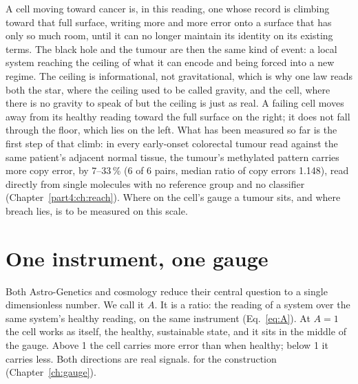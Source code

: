 A cell moving toward cancer is, in this reading, one whose record is climbing toward that full surface, writing more and more error onto
a surface that has only so much room, until it can no longer maintain its identity on its existing terms. The black hole and the tumour
are then the same kind of event: a local system reaching the ceiling of what it can encode and being forced into a new regime. \conjecture{}
The ceiling is informational, not gravitational, which is why one law reads both the star, where the ceiling used to be called gravity,
and the cell, where there is no gravity to speak of but the ceiling is just as real. A failing cell moves away from its healthy reading
toward the full surface on the right; it does not fall through the floor, which lies on the left. What has been measured so far is the
first step of that climb: in every early-onset colorectal tumour read against the same patient's adjacent normal tissue, the tumour's
methylated pattern carries more copy error, by 7--33\,\% (6 of 6 pairs, median ratio of copy errors 1.148), read directly from single
molecules with no reference group and no classifier (Chapter~\ref{part4:ch:reach}). \measured{} Where on the cell's gauge a tumour
sits, and where breach lies, is to be measured on this scale. \openprob

\section{One instrument, one gauge}\label{sec:ag_gauge}

Both Astro-Genetics and cosmology reduce their central question to a single dimensionless number. We call it $A$. It is a ratio: the
reading of a system over the same system's healthy reading, on the same instrument (Eq.~\eqref{eq:A}). At $A=1$ the cell works as itself,
the healthy, sustainable state, and it sits in the middle of the gauge. Above 1 the cell carries more error than when healthy; below 1 it
carries less. Both directions are real signals. \derived{} for the construction (Chapter~\ref{ch:gauge}).

